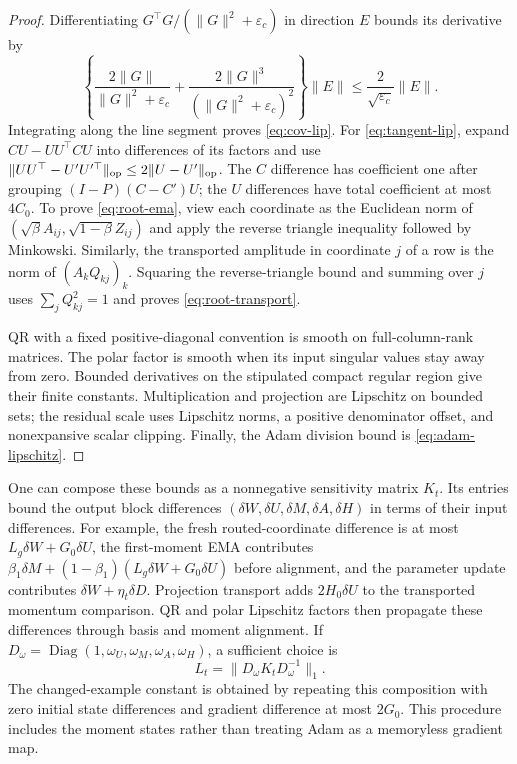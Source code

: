 \begin{proof}
Differentiating $G^\top G/(\|G\|^2+\varepsilon_c)$ in direction $E$
bounds its derivative by
\begin{equation}
 \left\{\frac{2\|G\|}{\|G\|^2+\varepsilon_c}
 +\frac{2\|G\|^3}{(\|G\|^2+\varepsilon_c)^2}\right\}\|E\|
 \le\frac{2}{\sqrt{\varepsilon_c}}\|E\|.
\end{equation}
Integrating along the line segment proves \eqref{eq:cov-lip}.
For \eqref{eq:tangent-lip}, expand $CU-UU^\top CU$ into differences
of its factors and use
$\|UU^\top-U'U'^\top\|_{\rm op}\le2\|U-U'\|_{\rm op}$.
The $C$ difference has coefficient one after grouping
$(I-P)(C-C')U$; the $U$ differences have total coefficient at most
$4C_0$. To prove \eqref{eq:root-ema}, view each coordinate as the
Euclidean norm of $(\sqrt\beta A_{ij},\sqrt{1-\beta}Z_{ij})$ and
apply the reverse triangle inequality followed by Minkowski.
Similarly, the transported amplitude in coordinate $j$ of a row is
the norm of $(A_kQ_{kj})_k$. Squaring the reverse-triangle bound and
summing over $j$ uses $\sum_jQ_{kj}^2=1$ and proves
\eqref{eq:root-transport}.

QR with a fixed positive-diagonal convention is smooth on full-column-rank
matrices. The polar factor is smooth when its input singular values stay
away from zero. Bounded derivatives on the stipulated compact regular
region give their finite constants. Multiplication and projection are
Lipschitz on bounded sets; the residual scale uses Lipschitz norms,
a positive denominator offset, and nonexpansive scalar clipping. Finally,
the Adam division bound is \eqref{eq:adam-lipschitz}.
\end{proof}

One can compose these bounds as a nonnegative sensitivity matrix $K_t$.
Its entries bound the output block differences
$(\delta W,\delta U,\delta M,\delta A,\delta H)$ in terms of their
input differences. For example, the fresh routed-coordinate difference is
at most $L_g\delta W+G_0\delta U$, the first-moment EMA contributes
$\beta_1\delta M+(1-\beta_1)(L_g\delta W+G_0\delta U)$ before
alignment, and the parameter update contributes
$\delta W+\eta_t\delta D$. Projection transport adds
$2H_0\delta U$ to the transported momentum comparison. QR and polar
Lipschitz factors then propagate these differences through basis and
moment alignment. If $D_\omega=\operatorname{Diag}(1,\omega_U,
\omega_M,\omega_A,\omega_H)$, a sufficient choice is
\begin{equation}
 L_t=\|D_\omega K_tD_\omega^{-1}\|_1.
 \label{eq:sensitivity-matrix}
\end{equation}
The changed-example constant is obtained by repeating this composition
with zero initial state differences and gradient difference at most
$2G_0$. This procedure includes the moment states rather than treating
Adam as a memoryless gradient map.

